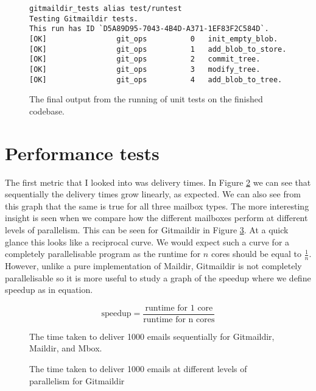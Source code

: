 \begin{figure}[h]
\centering
\begin{Verbatim}
gitmaildir_tests alias test/runtest
Testing Gitmaildir tests.
This run has ID `D5A89D95-7043-4B4D-A371-1EF83F2C584D`.
[OK]                git_ops          0   init_empty_blob.
[OK]                git_ops          1   add_blob_to_store.
[OK]                git_ops          2   commit_tree.
[OK]                git_ops          3   modify_tree.
[OK]                git_ops          4   add_blob_to_tree.
\end{Verbatim}
\caption{The final output from the running of unit tests on the finished codebase.}
\label{fig:unittests}
\end{figure}

\section{Performance tests}

The first metric that I looked into was delivery times. In Figure \ref{fig:tds_combined} we can see that sequentially the delivery times grow linearly, as expected. We can also see from this graph that the same is true for all three mailbox types. The more interesting insight is seen when we compare how the different mailboxes perform at different levels of parallelism. This can be seen for Gitmaildir in Figure \ref{fig:tdpp}. At a quick glance this looks like a reciprocal curve. We would expect such a curve for a completely parallelisable program as the runtime for $n$ cores should be equal to $\frac{1}{n}$. However, unlike a pure implementation of Maildir, Gitmaildir is not completely parallelisable so it is more useful to study a graph of the speedup where we define speedup as in equation.

\begin{equation} \label{eq:speedup}
\textrm{speedup} = \frac{\textrm{runtime for 1 core}}{\textrm{runtime for n cores}}
\end{equation}

\begin{figure}[h]
    \centering
    
    \caption{The time taken to deliver 1000 emails sequentially for Gitmaildir, Maildir, and Mbox.}
    \label{fig:tds_combined}
\end{figure}


\begin{figure}[h]
    \centering
    
    \caption{The time taken to deliver 1000 emails at different levels of parallelism for Gitmaildir}
    \label{fig:tdpp}
\end{figure}

